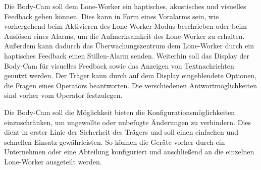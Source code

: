 \documentclass[thesis.tex]{subfiles}
\begin{document}
Die Body-Cam soll dem Lone-Worker ein haptisches, akustisches und visuelles Feedback geben können.
Dies kann in Form eines Voralarms sein, wie vorhergehend beim Aktivieren des Lone-Worker-Modus beschrieben oder beim Auslösen eines Alarms, um die Aufmerksamkeit des Lone-Worker zu erhalten.
Außerdem kann dadurch das Überwachungszentrum dem Lone-Worker durch ein haptisches Feedback einen \glqq Stillen\grqq{}-Alarm senden.
Weiterhin soll das Display der Body-Cam für visuelles Feedback sowie das Anzeigen von Textnachrichten genutzt werden.
Der Träger kann durch auf dem Display eingeblendete Optionen, die Fragen eines Operators beantworten.
Die verschiedenen Antwortmöglichkeiten sind vorher vom Operator festzulegen.

Die Body-Cam soll die Möglichkeit bieten die Konfigurationsmöglichkeiten einzuschränken, um ungewollte oder unbefugte Änderungen zu verhindern.
Dies dient in erster Linie der Sicherheit des Trägers und soll einen einfachen und schnellen Einsatz gewährleisten.
So können die Geräte vorher durch ein Unternehmen oder eine Abteilung konfiguriert und anschließend an die einzelnen Lone-Worker ausgeteilt werden.

\subfilebib %
\end{document}
